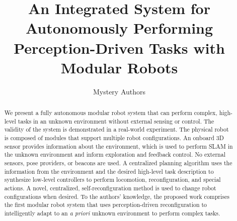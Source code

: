 \documentclass[conference]{IEEEtran}
\begin{document}
\title{An Integrated System for Autonomously Performing Perception-Driven Tasks with Modular Robots}

\author{Mystery Authors}


\maketitle

\begin{abstract}

We present a fully autonomous modular robot system that can perform complex, high-level tasks in an unknown environment without external sensing or control. The validity of the system is demonstrated in a real-world experiment. The physical robot is composed of modules that support multiple robot configurations. An onboard 3D sensor provides information about the environment, which is used to perform SLAM in the unknown environment and inform exploration and feedback control. No external sensors, pose providers, or beacons are used. A centralized planning algorithm uses the information from the environment and the desired high-level task description to synthesize low-level controllers to perform locomotion, reconfiguration, and special actions. A novel, centralized, self-reconfiguration method is used to change robot configurations when desired. To the authors' knowledge, the proposed work comprises the first modular robot system that uses perception-driven reconfiguration to intelligently adapt to an \textit{a priori} unknown environment to perform complex tasks.

\end{abstract}

\IEEEpeerreviewmaketitle

\end{document}
